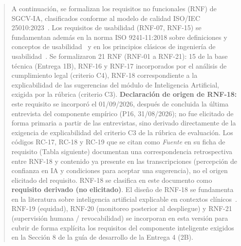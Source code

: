 \documentclass[
]{article}
\begin{document}
\begin{quote}
A continuación, se formalizan los requisitos no funcionales (RNF) de
SGCV-IA, clasificados conforme al modelo de calidad ISO/IEC
25010:2023~\cite{iso25010}. Los requisitos de usabilidad (RNF-07,
RNF-15) se fundamentan además en la norma ISO 9241-11:2018 sobre
definiciones y conceptos de usabilidad~\cite{iso9241} y en los
principios clásicos de ingeniería de usabilidad~\cite{nielsen1993}. Se
formalizaron 21 RNF (RNF-01 a RNF-21):
15 de la base técnica (Entrega 1B), RNF-16 y RNF-17 incorporados por el
análisis de cumplimiento legal (criterio C4), RNF-18 correspondiente
a la explicabilidad de las sugerencias del módulo de Inteligencia
Artificial, exigida por la rúbrica (criterio C3). \textbf{Declaración de
origen de RNF-18:} este requisito se incorporó el 01/09/2026, después
de concluida la última entrevista del componente empírico (P16,
31/08/2026); no fue elicitado de forma primaria a partir de las
entrevistas, sino derivado directamente de la exigencia de
explicabilidad del criterio C3 de la rúbrica de evaluación. Los
códigos RC-17, RC-18 y RC-19 que se citan como \emph{Fuente} en su
ficha de requisito (Tabla siguiente) documentan una correspondencia
retrospectiva entre RNF-18 y contenido ya presente en las
transcripciones (percepción de confianza en IA y condiciones para
aceptar una sugerencia), no el origen elicitado del requisito. RNF-18
se clasifica en este documento como \textbf{requisito derivado
(no elicitado)}. El diseño de RNF-18
se fundamenta en la literatura sobre inteligencia artificial
explicable en contextos clínicos~\cite{mienye2024,jung2023,rosenbacke2024,vanvoorst2024,tun2025,ahmed2023,he2023,bulletti2024}.
RNF-19 (equidad), RNF-20 (monitoreo posterior al despliegue) y RNF-21
(supervisión humana / revocabilidad) se incorporan en esta versión para
cubrir de forma explícita los requisitos del componente inteligente
exigidos en la Sección 8 de la guía de desarrollo de la Entrega 4 (2B).
\end{quote}
\end{document}
